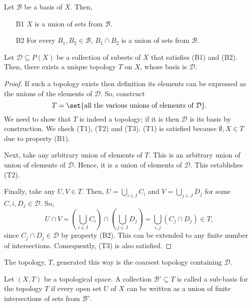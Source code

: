\begin{nlemma}
  Let $\mathcal{B}$ be a basis of $X$. Then,
  \begin{enumerate}
  \item[B1] $X$ is a union of sets from $\mathcal{B}$.
  \item[B2] For every $B_1, B_2 \in \mathcal{B}$, $B_1 \cap B_2$ is a union of sets from $\mathcal{B}$.
  \end{enumerate}
\end{nlemma}

\begin{nlemma}
  Let $\mathcal{D} \subseteq P(X)$ be a collection of subsets of $X$ that satisfies (B1) and (B2). Then, there exists a unique topology $T$ on $X$, whose basis is $\mathcal{D}$.
\end{nlemma}
\begin{proof}
  If such a topology exists then definition its elements can be expressed as the unions of the elements of $\mathcal{D}$. So, construct
  \begin{equation*}
    T = \set{\text{all the various unions of elements of } \mathcal{D}}.
  \end{equation*}
  We need to show that $T$ is indeed a topology; if it is then $\mathcal{D}$ is its basis by construction. We check (T1), (T2) and (T3). (T1) is satisfied because $\emptyset, X \in T$ due to property (B1).

  Next, take any arbitrary union of elements of $T$. This is an arbitrary union of union of elements of $\mathcal{D}$. Hence, it is a union of elements of $\mathcal{D}$. This establishes (T2).

  Finally, take any $U, V \in T$. Then, $U = \bigcup_{i\in I} C_i$ and $V = \bigcup_{j \in J} D_j$ for some $C,i, D_j \in \mathcal{D}$. So,
  \begin{equation*}
    U \cap V = \left(\bigcup_{i\in I} C_i\right) \cap \left(\bigcup_{j \in J} D_j\right)
    = \bigcup_{i,j} \left(C_j \cap D_j\right) \in T,
  \end{equation*}
  since $C_j \cap D_j \in \mathcal{D}$ by property (B2). This can be extended to any finite number of intersections. Consequently, (T3) is also satisfied.
\end{proof}
The topology, $T$, generated this way is the coarsest topology containing $\mathcal{D}$.

\begin{ndfn}
  Let $(X,T)$ be a topological space. A collection $\mathcal{B}' \subseteq T$ is called a sub-basis for the topology $T$ if every open set $U$ of $X$ can be written as a union of finite intersections of sets from $\mathcal{B}'$.
\end{ndfn}


